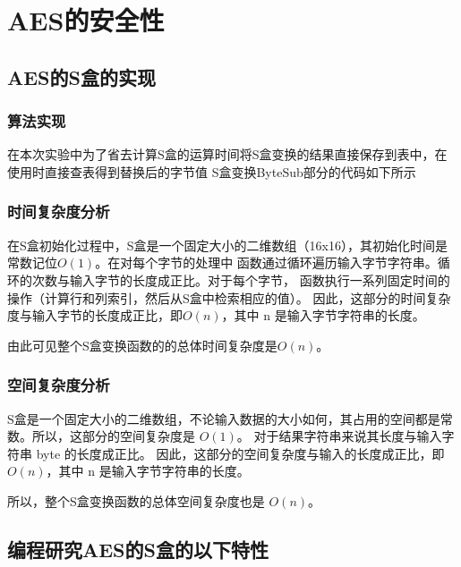 \documentclass[a4paper,11pt,UTF8]{ctexart}
\begin{document}
\section{AES的安全性}
    \subsection{AES的S盒的实现}
        \subsubsection{算法实现}
            在本次实验中为了省去计算S盒的运算时间将S盒变换的结果直接保存到表中，在使用时直接查表得到替换后的字节值
            S盒变换ByteSub部分的代码如下所示
            
        \subsubsection{时间复杂度分析}
            在S盒初始化过程中，S盒是一个固定大小的二维数组（16x16），其初始化时间是常数记位$ O(1)$。在对每个字节的处理中
            函数通过循环遍历输入字节字符串。循环的次数与输入字节的长度成正比。对于每个字节，
            函数执行一系列固定时间的操作（计算行和列索引，然后从S盒中检索相应的值）。
            因此，这部分的时间复杂度与输入字节的长度成正比，即$ O(n)$，其中 n 是输入字节字符串的长度。\par
            由此可见整个S盒变换函数的的总体时间复杂度是$ O(n)$。
            
        \subsubsection{空间复杂度分析}
            S盒是一个固定大小的二维数组，不论输入数据的大小如何，其占用的空间都是常数。所以，这部分的空间复杂度是 $O(1)$。
            对于结果字符串来说其长度与输入字符串 byte 的长度成正比。
            因此，这部分的空间复杂度与输入的长度成正比，即 $O(n)$，其中 n 是输入字节字符串的长度。\par
            所以，整个S盒变换函数的总体空间复杂度也是 $O(n)$。

    \subsection{编程研究AES的S盒的以下特性}
\end{document}
